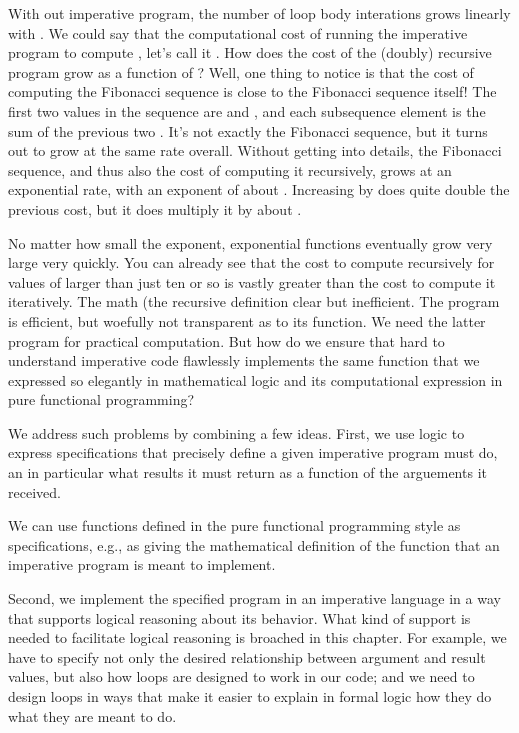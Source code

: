 \documentclass[letterpaper,10pt,english]{sphinxmanual}
\begin{document}
With out imperative program, the number of loop body interations grows
linearly with . We could say that the computational cost of running
the imperative program to compute , let’s call it . How does the cost of the (doubly) recursive program grow
as a function of ? Well, one thing to notice is that the cost of
computing the Fibonacci sequence is close to the Fibonacci sequence
itself! The first two values in the  sequence are  and ,
and each subsequence element is the sum of the previous two .
It’s not exactly the Fibonacci sequence, but it turns out to grow at
the same rate overall. Without getting into details, the Fibonacci
sequence, and thus also the cost of computing it recursively, grows at
an exponential rate, with an exponent of about . Increasing 
by  does quite double the previous cost, but it does multiply it by
about .

No matter how small the exponent, exponential functions eventually
grow very large very quickly. You can already see that the cost to
compute  recursively for values of  larger than just ten or
so is vastly greater than the cost to compute it iteratively. The math
(the recursive definition clear but inefficient. The program is
efficient, but woefully not transparent as to its function. We need
the latter program for practical computation. But how do we ensure
that hard to understand imperative code flawlessly implements the same
function that we expressed so elegantly in mathematical logic and its
computational expression in pure functional programming?

We address such problems by combining a few ideas. First, we use logic
to express  specifications that precisely define  a
given imperative program must do, an in particular what results it
must return as a function of the arguements it received.

We can use functions defined in the pure functional programming style
as specifications, e.g., as giving the mathematical definition of the
 function that an imperative program is meant to implement.

Second, we implement the specified program in an imperative language
in a way that supports logical reasoning about its behavior. What kind
of support is needed to facilitate logical reasoning is broached in
this chapter. For example, we have to specify not only the desired
relationship between argument and result values, but also how loops
are designed to work in our code; and we need to design loops in ways
that make it easier to explain in formal logic how they do what they
are meant to do.
\end{document}
